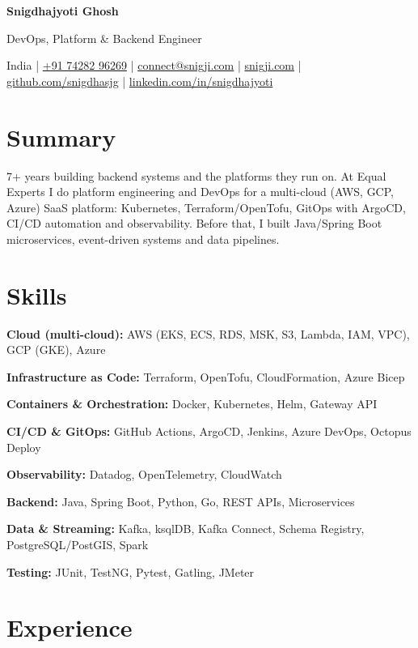 \documentclass[10pt,a4paper]{article}
\begin{document}
{\LARGE\bfseries Snigdhajyoti Ghosh}\par\vspace{2pt}
{\color{dim}DevOps, Platform \& Backend Engineer}\par
{\small\color{dim}India |
\href{tel:+917428296269}{+91 74282 96269} |
\href{mailto:connect@snigji.com}{connect@snigji.com} |
\href{https://snigji.com}{snigji.com} |
\href{https://github.com/snigdhasjg}{github.com/snigdhasjg} |
\href{https://www.linkedin.com/in/snigdhajyoti}{linkedin.com/in/snigdhajyoti}}

\section*{Summary}
7+ years building backend systems and the platforms they run on. At Equal Experts I do
platform engineering and DevOps for a multi-cloud (AWS, GCP, Azure) SaaS platform:
Kubernetes, Terraform/OpenTofu, GitOps with ArgoCD, CI/CD automation and observability.
Before that, I built Java/Spring Boot microservices, event-driven systems and data
pipelines.

\section*{Skills}
\textbf{Cloud (multi-cloud):} AWS (EKS, ECS, RDS, MSK, S3, Lambda, IAM, VPC), GCP (GKE), Azure\par
\textbf{Infrastructure as Code:} Terraform, OpenTofu, CloudFormation, Azure Bicep\par
\textbf{Containers \& Orchestration:} Docker, Kubernetes, Helm, Gateway API\par
\textbf{CI/CD \& GitOps:} GitHub Actions, ArgoCD, Jenkins, Azure DevOps, Octopus Deploy\par
\textbf{Observability:} Datadog, OpenTelemetry, CloudWatch\par
\textbf{Backend:} Java, Spring Boot, Python, Go, REST APIs, Microservices\par
\textbf{Data \& Streaming:} Kafka, ksqlDB, Kafka Connect, Schema Registry, PostgreSQL/PostGIS, Spark\par
\textbf{Testing:} JUnit, TestNG, Pytest, Gatling, JMeter\par

\section*{Experience}
\end{document}
